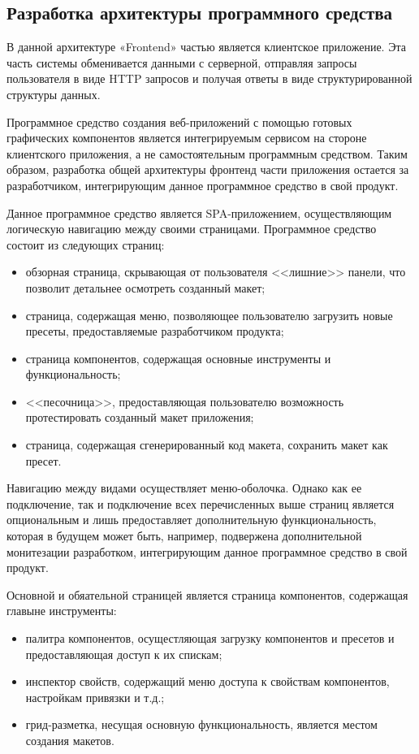 \subsection{Разработка архитектуры программного средства}
\label{sec:modeling:sequence_diagram}

В данной архитектуре «Frontend» частью является клиентское приложение. Эта часть системы обменивается данными с серверной, отправляя запросы пользователя в виде HTTP запросов и получая ответы в виде структурированной структуры данных. 

Программное средство создания веб-приложений с помощью готовых графических компонентов является интегрируемым сервисом на стороне клиентского приложения, а не самостоятельным программным средством. Таким образом, разработка общей архитектуры фронтенд части приложения остается за разработчиком, интегрирующим данное программное средство в свой продукт.

Данное программное средство является SPA-приложением, осуществляющим логическую навигацию между своими страницами. Программное средство состоит из следующих страниц:

\begin{itemize}
    \item обзорная страница, скрывающая от пользователя <<лишние>> панели, что позволит детальнее осмотреть созданный макет;
    \item страница, содержащая меню, позволяющее пользователю загрузить новые пресеты, предоставляемые разработчиком продукта;
    \item страница компонентов, содержащая основные инструменты и функциональность;
    \item <<песочница>>, предоставляющая пользователю возможность протестировать созданный макет приложения;
    \item страница, содержащая сгенерированный код макета, сохранить макет как пресет.
\end{itemize}

Навигацию между видами осуществляет меню-оболочка. Однако как ее подключение, так и подключение всех перечисленных выше страниц является опциональным и лишь предоставляет дополнительную функциональность, которая в будущем может быть, например, подвержена дополнительной монитезации разработком, интегрирующим данное программное средство в свой продукт.

Основной и обяательной страницей является страница компонентов, содержащая главыне инструменты:

\begin{itemize}
    \item палитра компонентов, осущестляющая загрузку компонентов и пресетов и предоставляющая доступ к их спискам;
    \item инспектор свойств, содержащий меню доступа к свойствам компонентов, настройкам привязки и т.д.;
    \item грид-разметка, несущая основную функциональность, является местом создания макетов.
\end{itemize}

